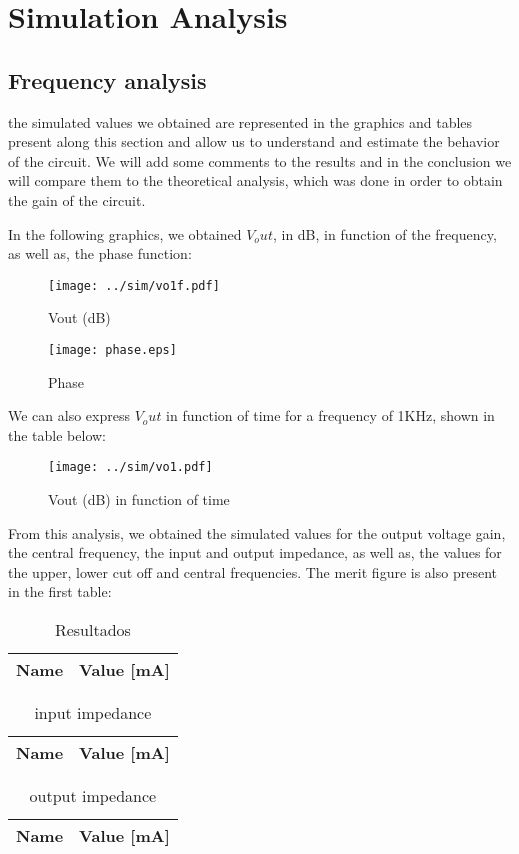 \section{Simulation Analysis}
\label{sec:simulation}

\subsection{Frequency analysis}
the simulated values we obtained are represented in the graphics and tables present along this section and allow us to understand and estimate the behavior of the circuit. We will add some comments to the results and in the conclusion we will compare them to the theoretical analysis, which was done in order to obtain the gain of the circuit.

In the following graphics, we obtained $V_out$, in dB, in function of the frequency, as well as, the phase function:
\begin{figure}[H] \centering
	\texttt{[image: ../sim/vo1f.pdf]}
	\caption{Vout (dB)}
	\label{fig:rc4}
\end{figure}

\begin{figure}[H] \centering
	\texttt{[image: phase.eps]}
	\caption{Phase}
	\label{fig:rc4}
\end{figure}

We can also express $V_out$ in function of time for a frequency of 1KHz, shown in the table below:
\begin{figure}[H] \centering
	\texttt{[image: ../sim/vo1.pdf]}
	\caption{Vout (dB) in function of time}
	\label{fig:rc4}
\end{figure}

From this analysis, we obtained the simulated values for the output voltage gain, the central frequency, the input and output impedance, as well as, the values for the upper, lower cut off and central frequencies. The merit figure is also present in the first table:

\begin{table}[H]
	\centering
	\begin{tabular}{|l|r|}
		\hline    
		{\bf Name} & {\bf Value [mA]} \\ \hline
		
	\end{tabular}
	\caption{Resultados}
	\label{tab:op}
\end{table}

\begin{table}[H]
	\centering
	\begin{tabular}{|l|r|}
		\hline    
		{\bf Name} & {\bf Value [mA]} \\ \hline
		
	\end{tabular}
	\caption{input impedance}
	\label{tab:op}
\end{table}

\begin{table}[H]
	\centering
	\begin{tabular}{|l|r|}
		\hline    
		{\bf Name} & {\bf Value [mA]} \\ \hline
		
	\end{tabular}
	\caption{output impedance}
	\label{tab:op}
\end{table}

